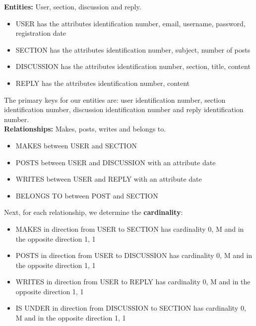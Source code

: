\documentclass[12pt,a4paper]{amsart}
\begin{document}
{\textbf{Entities:} User, section, discussion and reply.
\vspace{2mm}
\begin{itemize}
\item USER has the attributes identification number, email, username, password, registration date
\item SECTION has the attributes identification number, subject, number of posts
\item DISCUSSION has the attributes identification number, section, title, content
\item REPLY has the attributes identification number, content\\
\end{itemize}
The primary keys for our entities are: user identification number, section identification number, discussion identification number and reply identification number.\\

\textbf{Relationships:} Makes, posts, writes and belongs to.
\vspace{2mm}
\begin{itemize}
\item MAKES between USER and SECTION
\item POSTS between USER and DISCUSSION with an attribute date
\item WRITES between USER and REPLY with an attribute date
\item BELONGS TO between POST and SECTION\\
\end{itemize}
\vspace{4mm}
Next, for each relationship, we determine the \textbf{cardinality}:

\vspace{2mm}
\begin{itemize}
\item MAKES in direction from USER to SECTION has cardinality 0, M and in the opposite direction 1, 1
\item POSTS in direction from USER to DISCUSSION has cardinality 0, M and in the opposite direction 1, 1
\item WRITES in direction from USER to REPLY has cardinality 0, M and in the opposite direction 1, 1
\item IS UNDER in direction from DISCUSSION to SECTION has cardinality 0, M and in the opposite direction 1, 1\\
\end{itemize}

}
\end{document}
